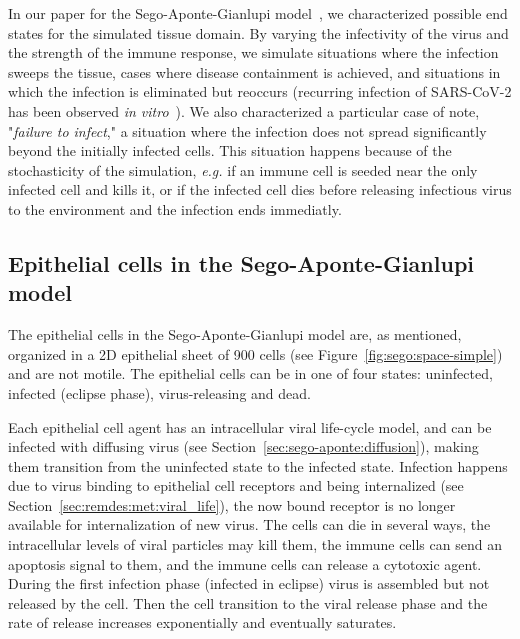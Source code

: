  In our paper for the Sego-Aponte-Gianlupi model~\cite{sego_modular_2020}, we characterized possible end states for the simulated tissue domain. By varying the infectivity of the virus and the strength of the immune response, we simulate situations where the infection sweeps the tissue, cases where disease containment is achieved, and situations in which the infection is eliminated but reoccurs (recurring infection of SARS-CoV-2 has been observed \emph{in vitro}~\cite{hao_long-term_2020}). We also characterized a particular case of note, "\emph{failure to infect}," a situation where the infection does not spread significantly beyond the initially infected cells. This situation happens because of the stochasticity of the simulation, \emph{e.g.}  if an immune cell is seeded near the only infected cell and kills it, or if the infected cell dies before releasing infectious virus to the environment and the infection ends immediatly.

 

\subsection{Epithelial cells in the Sego-Aponte-Gianlupi model}\label{sec:sego-aponte:epi}

The epithelial cells in the Sego-Aponte-Gianlupi model are, as mentioned, organized in a 2D epithelial sheet of 900 cells (see Figure~\ref{fig:sego:space-simple}) and are not motile. The epithelial cells can be in one of four states: uninfected, infected (eclipse phase), virus-releasing and dead. 

Each epithelial cell agent has an intracellular viral life-cycle model, and can be infected with diffusing virus (see Section~\ref{sec:sego-aponte:diffusion}), making them transition from the uninfected state to the infected state. Infection happens due to virus binding to epithelial cell receptors and being internalized (see Section~\ref{sec:remdes:met:viral_life}), the now bound receptor is no longer available for internalization of new virus. The cells can die in several ways, the intracellular levels of viral particles may kill them, the immune cells can send an apoptosis signal to them, and the immune cells can release a cytotoxic agent. During the first infection phase (infected in eclipse) virus is assembled but not released by the cell. Then the cell transition to the viral release phase and the rate of release increases exponentially and eventually saturates. 


